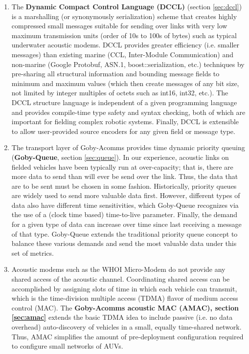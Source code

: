 \begin{enumerate}
\item The \textbf{Dynamic Compact Control Language (DCCL)} (section \ref{sec:dccl}) is a marshalling (or synonymously serialization) scheme that creates highly compressed small messages suitable for sending over links with very low maximum transmission units (order of 10s to 100s of bytes) such as typical underwater acoustic modems. DCCL  provides greater efficiency (i.e. smaller messages) than existing marine (CCL, Inter-Module Communication) and non-marine (Google Protobuf, ASN.1, boost::serialization, etc.) techniques by pre-sharing all structural information and bounding message fields to minimum and maximum values (which then create messages of any bit size, not limited by integer multiples of octets such as int16, int32, etc.). The DCCL structure language is independent of a given programming language and provides compile-time type safety and syntax checking, both of which are important for fielding complex robotic systems. Finally, DCCL is extensible to allow user-provided source encoders for any given field or message type.
\item The transport layer of Goby-Acomms provides time dynamic priority queuing (\textbf{Goby-Queue}, section \ref{sec:queue}). In our experience, acoustic links on fielded vehicles have been typically run at over-capacity; that is, there are more data to send than will ever be send over the link. Thus, the data that are to be sent must be chosen in some fashion. Historically, priority queues are widely used to send more valuable data first. However, different types of data also have different time sensitivities, which Goby-Queue recognizes via the use of a (clock time based) time-to-live parameter. Finally, the demand for a given type of data can increase over time since last receiving a message of that type. Goby-Queue extends the traditional priority queue concept to balance these various demands and send the most valuable data under this set of metrics.
\item Acoustic modems such as the WHOI Micro-Modem do not provide any shared access of the acoustic channel. Coordinating shared access can be accomplished by assigning slots of time in which each vehicle can transmit, which is the time-division multiple access (TDMA) flavor of medium access control (MAC). The \textbf{Goby-Acomms acoustic MAC (AMAC), section \ref{sec:amac}} extends the basic TDMA idea to include passive (i.e. no data overhead) auto-discovery of vehicles in a small, equally time-shared network. Thus, AMAC simplifies the amount of pre-deployment configuration required to configure small networks of AUVs.

\end{enumerate}
